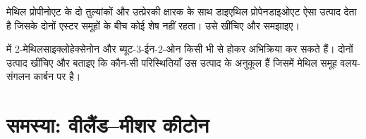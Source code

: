 \begin{exercise}[$\star\star\star$]\label{exo:b2:conjugate-additions:11}
मेथिल प्रोपीनोएट के दो तुल्यांकों और उत्प्रेरकी क्षारक के साथ डाइएथिल प्रोपेनडाइओएट ऐसा उत्पाद देता है
जिसके दोनों एस्टर समूहों के बीच कोई  शेष नहीं रहता। उसे खींचिए और समझाइए।
\end{exercise}

\begin{exercise}[$\star\star\star$]\label{exo:b2:conjugate-additions:12}
 में 2-मेथिलसाइक्लोहेक्सेनोन और ब्यूट-3-ईन-2-ओन किसी भी  से होकर अभिक्रिया कर सकते हैं।
दोनों उत्पाद खींचिए और बताइए कि कौन-सी परिस्थितियाँ उस उत्पाद के अनुकूल हैं जिसमें मेथिल समूह वलय-संगलन
कार्बन पर है।
\end{exercise}

\section{समस्या: वीलैंड--मीशर कीटोन}

